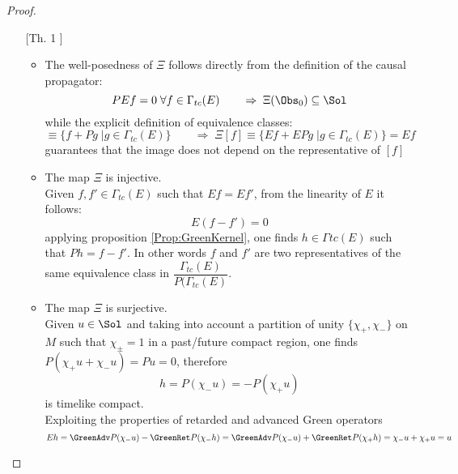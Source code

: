 \documentclass[Main]{subfiles}
\begin{document}
	\begin{proof}
		\begin{itemize}
			\item[	[Th. 1]]
				\begin{itemize}
					\item The well-posedness of $\Xi$ follows directly from the definition of the causal propagator:
						\begin{displaymath}
							P E f = 0 \; \forall f \in \Gamma_{tc}(E) \qquad \Rightarrow \; \Xi ( \Obs_0) \subseteq \Sol
						\end{displaymath}
						while the explicit definition of equivalence classes:
						\begin{displaymath}
							[f] \equiv \{ f + P g \; \vert g \in \Gamma_{tc}(E)\} \qquad\Rightarrow \;
							 \Xi [f] \equiv \{ E f + E P g \;\vert g \in \Gamma_{tc}(E)\} = E f
						\end{displaymath}
						guarantees that the image does not depend on the representative of $[f]$
					\item %
						The map $\Xi$ is injective.\\
						Given $f , f' \in \Gamma_{tc}(E)$ such that $E f = E f'$, from the linearity of $E$ it follows:
						\begin{displaymath}
							E ( f - f') = 0
						\end{displaymath}			
						applying proposition \ref{Prop:GreenKernel}, one finds $h \in \Gamma{tc}(E)$ such that $P h = f - f'$. 
						In other words $f$ and $f'$  are two representatives of the same equivalence class in $\dfrac{\Gamma_{tc}(E)}{P ( \Gamma_{tc}(E)} $.
					\item The map $\Xi$ is surjective.\\
						Given $u \in \Sol$ and taking into account a partition of unity $\{\chi_+, \chi_-\}$ on $M$ such that $\chi_\pm = 1$ in a past/future compact region, one finds $P ( \chi_+ u +  \chi_- u ) = P u=0$, therefore 
						\begin{displaymath}
							h = P(\chi_-u) = - P(\chi_+ u)
						\end{displaymath}
						is timelike compact.\\
						Exploiting the properties of retarded and advanced Green operators
						\begin{displaymath}
							E h = \GreenAdv P (\chi_- u ) - \GreenRet P (\chi_- h ) = 
							\GreenAdv P (\chi_- u ) + \GreenRet P (\chi_+ h ) = \chi_-u + \chi_+ u = u
						\end{displaymath} 

\end{itemize}
\end{itemize}
\end{proof}
\end{document}
